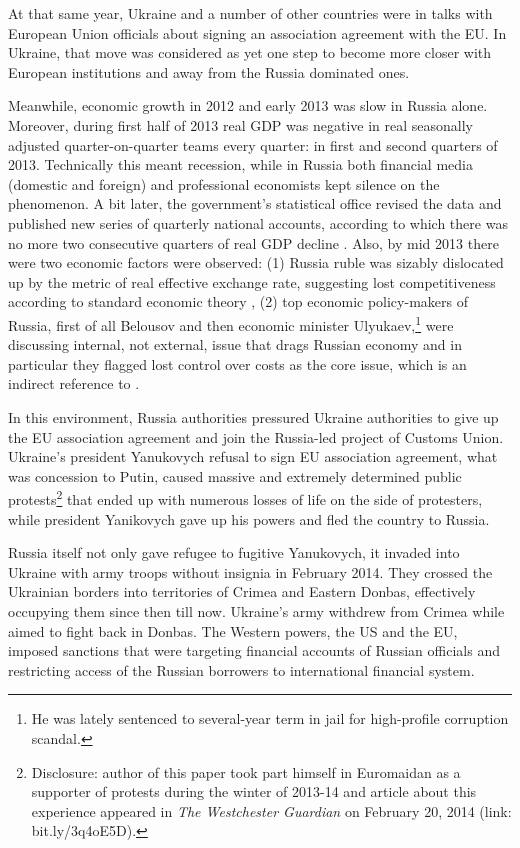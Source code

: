 At that same year, Ukraine and a number of other countries were in talks
with European Union officials about signing an association agreement
with the EU. In Ukraine, that move was considered as yet one step to
become more closer with European institutions and away from the Russia
dominated ones.

Meanwhile, economic growth in 2012 and early 2013 was slow in Russia
alone. Moreover, during first half of 2013 real GDP was negative in real
seasonally adjusted quarter-on-quarter teams every quarter: in first and
second quarters of 2013. Technically this meant recession, while in
Russia both financial media (domestic and foreign) and professional
economists kept silence on the phenomenon. A bit later, the government's
statistical office revised the data and published new series of
quarterly national accounts, according to which there was no more two
consecutive quarters of real GDP decline \citep[p.~30]{valchyshen_2014}. Also,
by mid 2013 there were two economic factors were observed: (1) Russia
ruble was sizably dislocated up by the metric of real effective exchange
rate, suggesting lost competitiveness according to standard economic
theory \citep[pp.~9-10]{valchyshen_2013}, (2) top economic policy-makers of
Russia, first of all Belousov and then economic minister Ulyukaev,\footnote{He was lately sentenced to several-year term in jail for high-profile corruption scandal.}
were discussing internal, not external, issue that drags Russian economy
and in particular they flagged lost control over costs as the core
issue, which is an indirect reference to \citep[pp.~9-10]{valchyshen_2015}.

In this environment, Russia authorities pressured Ukraine authorities to
give up the EU association agreement and join the Russia-led project of
Customs Union. Ukraine's president Yanukovych refusal to sign EU
association agreement, what was concession to Putin, caused massive and
extremely determined public protests\footnote{Disclosure: author of this paper took part himself in Euromaidan as a supporter of protests during the winter of 2013-14 and article about this experience appeared in \textit{The Westchester Guardian} on February 20, 2014 (link: bit.ly/3q4oE5D).} that ended up with numerous
losses of life on the side of protesters, while president Yanikovych
gave up his powers and fled the country to Russia.

Russia itself not only gave refugee to fugitive Yanukovych, it invaded
into Ukraine with army troops without insignia in February 2014. They
crossed the Ukrainian borders into territories of Crimea and Eastern
Donbas, effectively occupying them since then till now. Ukraine's army
withdrew from Crimea while aimed to fight back in Donbas. The Western
powers, the US and the EU, imposed sanctions that were targeting
financial accounts of Russian officials and restricting access of the
Russian borrowers to international financial system.

